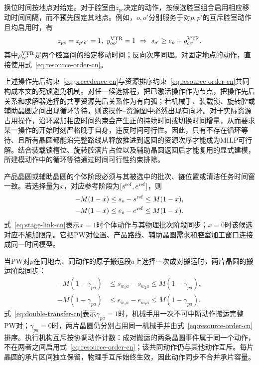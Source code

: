 \documentclass[final,5p,times,twocolumn]{elsarticle}
\begin{document}
换位时间按地点对给定。对于腔室由$z_{pc}$决定的动作，按候选腔室组合启用相应移动时间间隔，而不预先固定其地点。例如，$o,o'$分别服务于对$p,p'$的互斥腔室动作且均启用时，有
\begin{equation}
\begin{aligned}
z_{pc}=z_{p'c'}=1,\ y^{\rm VTR}_{oo'}=1
\ \Rightarrow\ s_{o'}\ge e_o+\rho^{\rm VTR}_{cc'}.
\end{aligned}
\label{eq:location-travel-cn}
\end{equation}
其中$\rho^{\rm VTR}_{cc'}$是两个腔室间的给定移动时间；反向次序同理。对固定地点的动作，直接使用式~\eqref{eq:resource-order-cn}。

上述操作先后约束~\eqref{eq:precedence-cn}与资源排序约束~\eqref{eq:resource-order-cn}共同构成本文的死锁避免机制。对任一候选排程，把已激活操作作为节点，把操作先后关系和求解器选择的共享资源先后关系作为有向弧；若机械手、装载锁、旋转腔或辅助晶圆之间出现循环等待，则该操作--资源图中必然出现有向环。对于实际资源占用操作，沿环累加相应时间约束会产生正的持续时间或切换时间增量，从而要求某一操作的开始时刻严格晚于自身，违反时间可行性。因此，只有不存在循环等待、且所有晶圆都能沿完整路线从释放推进到返回的资源次序才能成为MILP可行解。结合装载锁槽位、旋转腔满片占位以及辅助晶圆返回后才能复用的显式建模，所建模动作中的循环等待通过时间可行性约束排除。

产品晶圆或辅助晶圆的个体阶段必须与其被选中的批次、链位置或清洁任务时间窗一致。若选择量为$x$，对应参考阶段为$[s^{\rm ref},e^{\rm ref}]$，则
\begin{equation}
\begin{aligned}
-M(1-x)&\le s_o-s^{\rm ref}\le M(1-x),\\
-M(1-x)&\le e_o-e^{\rm ref}\le M(1-x).
\end{aligned}
\label{eq:stage-link-cn}
\end{equation}
式~\eqref{eq:stage-link-cn}表示$x=1$时个体动作与其物理批次阶段同步；$x=0$时该候选对应不施加限制。它把PW对位置、产品路线、辅助晶圆需求和腔室加工窗口连接成同一时间模型。

当PW对$p$在同地点、同动作的原子搬运段$a$上选择一次成对搬运时，两片晶圆的搬运阶段同步：
\begin{equation}
\begin{aligned}
-M(1-\gamma_{pa})&\le s_{w_1a}-s_{w_2a}\le M(1-\gamma_{pa}),\\
-M(1-\gamma_{pa})&\le e_{w_1a}-e_{w_2a}\le M(1-\gamma_{pa}).
\end{aligned}
\label{eq:double-transfer-cn}
\end{equation}
式~\eqref{eq:double-transfer-cn}表示$\gamma_{pa}=1$时，机械手用一次不可中断动作搬运完整PW对；$\gamma_{pa}=0$时，两片晶圆仍分别占用同一机械手并由式~\eqref{eq:resource-order-cn}排序。执行机构互斥按协调动作计数：成对搬运的两条晶圆事件属于同一个动作，不在两者之间启用式~\eqref{eq:resource-order-cn}；该共同动作仍与其他动作互斥。每片晶圆的承片区间独立保留，物理手互斥始终生效，因此动作同步不合并承片容量。
\end{document}
